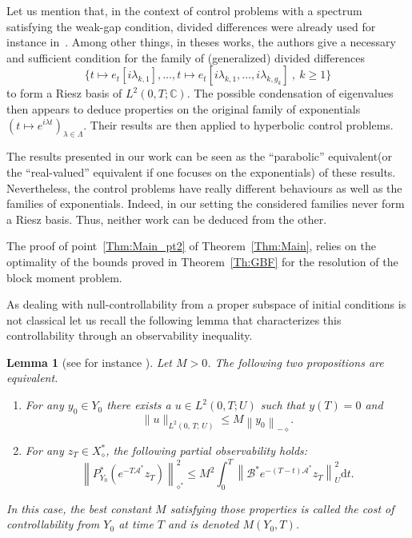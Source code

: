 \documentclass[11pt]{article}
\newtheorem{lemm}[theo]{Lemma}
\theoremstyle{definition}
\numberwithin{equation}{section}
\numberwithin{figure}{section}
\numberwithin{table}{section}
\newcommand\As{\mathcal{A}^*}
\newcommand\Bs{\mathcal{B}^*}
\newcommand{\Xalphas}{X_\diamond^*}
\newcommand{\Fzp}{Y_0}
\newcommand{\normeU}[1]{\left\| #1 \right\|_U}
\newcommand{\normeXalphas}[1]{\left\| #1 \right\|_{\diamond^*}}
\newcommand{\normeXmalpha}[1]{\left\| #1 \right\|_{-\diamond}}
\newcommand{\PFa}{P_{\Fzp}^*}
\newcommand{\n}{g}
\newcommand{\C}{\mathbb{C}}
\newcommand{\md}{\mathrm{d}}
\begin{document}
Let us mention that, in the context of control problems with a spectrum satisfying the weak-gap condition, divided differences were already used for instance in~\cite{AvdoninIvanov01,BaiocchiKomornikLoreti:2002}. Among other things, in theses works, the authors give a necessary and sufficient condition for the family of (generalized) divided differences
\[
\big\{ t \mapsto e_t[i \lambda_{k,1}], \dotsc, t \mapsto e_t[i \lambda_{k,1}, \dotsc, i \lambda_{k, \n_k}] \:, \: k \geq 1 \big\}
\]
to form a Riesz basis of $L^2(0,T ; \C)$. The possible condensation of eigenvalues then appears to deduce properties on the original family of exponentials $(t\mapsto e^{i \lambda t})_{\lambda \in \Lambda}$. Their results are then applied to hyperbolic control problems.

The results presented in our work can be seen as the ``parabolic'' equivalent\linebreak(or the ``real-valued'' equivalent if one focuses on the exponentials) of these results. Nevertheless, the control problems have really different behaviours as well as the families of exponentials. Indeed, in our setting the considered families never form a Riesz basis. Thus, neither work can be deduced from the other.

The proof of point~\eqref{Thm:Main_pt2} of Theorem~\ref{Thm:Main}, relies on the optimality of the bounds proved in Theorem~\ref{Th:GBF} for the resolution of the block moment problem.

As dealing with null-controllability from a proper subspace of initial conditions is not classical let us recall the following lemma that characterizes this controllability through an observability inequality.

\begin{lemm}[see for instance {\cite[Lemma~2.1]{AB18}}]\label{Lemmme:Observabilite}
Let $M>0$.
The following two propositions are equivalent.
\begin{enumerate}
\item \label{1.13.1} For any $y_0 \in \Fzp$ there exists a $u \in L^2(0,T;U)$ such that $y(T) = 0$ and
\begin{equation*}
\| u \|_{L^2(0,\,T ;\,U)} \leq M \normeXmalpha{ y_0 }.
\end{equation*}
\item \label{1.13.2}For any $z_T \in \Xalphas$, the following partial observability holds:
\begin{equation}\label{InegObs}
\normeXalphas{ \PFa \left(e^{-T \As} z_T \right) }^2 \leq M^2 \int_0^T \normeU{ \Bs e^{-(T-t) \As} z_T }^2 \md t.
\end{equation}
\end{enumerate}
In this case, the best constant $M$ satisfying those properties is called the cost of controllability from $\Fzp$ at time $T$ and is denoted $M(\Fzp,T)$.
\end{lemm}
\end{document}
